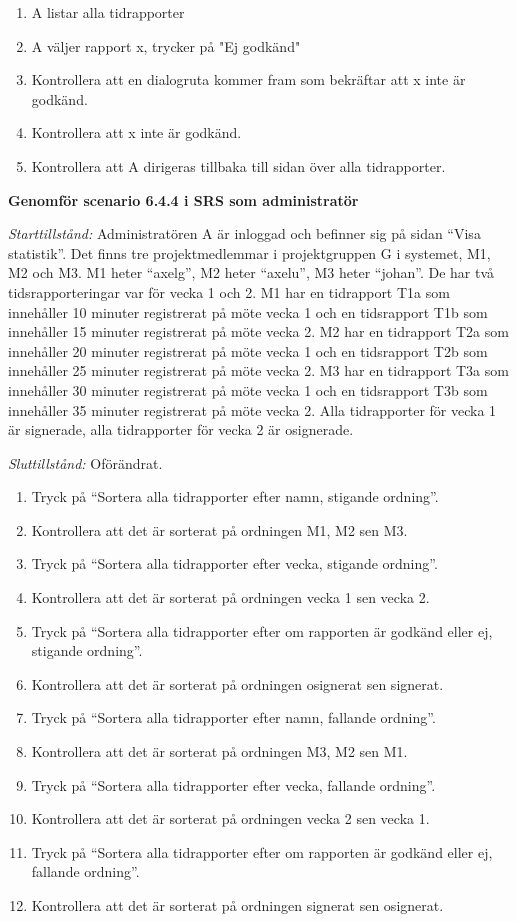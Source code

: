 \documentclass[a4paper]{article}
\begin{document}
\begin{ST}
\begin{enumerate}
\item A listar alla tidrapporter
\item A väljer rapport x, trycker på "Ej godkänd"
\item Kontrollera att en dialogruta kommer fram som bekräftar att x inte är godkänd.
\item Kontrollera att x inte är godkänd.
\item Kontrollera att A dirigeras tillbaka till sidan över alla tidrapporter.
\end{enumerate}

\item
\textbf{Genomför scenario 6.4.4 i SRS som administratör}

\emph{Starttillstånd:} Administratören A är inloggad och befinner sig på sidan ``Visa statistik''. Det finns tre projektmedlemmar i projektgruppen G i systemet, M1, M2 och M3. M1 heter ``axelg'', M2 heter ``axelu'', M3 heter ``johan''. De har två tidsrapporteringar var för vecka 1 och 2. M1 har en tidrapport T1a som innehåller 10 minuter registrerat på möte vecka 1 och en tidsrapport T1b som innehåller 15 minuter registrerat på möte vecka 2. M2 har en tidrapport T2a som innehåller 20 minuter registrerat på möte vecka 1 och en tidsrapport T2b som innehåller 25 minuter registrerat på möte vecka 2. M3 har en tidrapport T3a som innehåller 30 minuter registrerat på möte vecka 1 och en tidsrapport T3b som innehåller 35 minuter registrerat på möte vecka 2. Alla tidrapporter för vecka 1 är signerade, alla tidrapporter för vecka 2 är osignerade.

\emph{Sluttillstånd:} Oförändrat.

\begin{enumerate}
\item Tryck på ``Sortera alla tidrapporter efter namn, stigande ordning''.
\item Kontrollera att det är sorterat på ordningen M1, M2 sen M3.
\item Tryck på ``Sortera alla tidrapporter efter vecka, stigande ordning''.
\item Kontrollera att det är sorterat på ordningen vecka 1 sen vecka 2.
\item Tryck på ``Sortera alla tidrapporter efter om rapporten är godkänd eller ej, stigande ordning''.
\item Kontrollera att det är sorterat på ordningen osignerat sen signerat.
\item Tryck på ``Sortera alla tidrapporter efter namn, fallande ordning''.
\item Kontrollera att det är sorterat på ordningen M3, M2 sen M1.
\item Tryck på ``Sortera alla tidrapporter efter vecka, fallande ordning''.
\item Kontrollera att det är sorterat på ordningen vecka 2 sen vecka 1.
\item Tryck på ``Sortera alla tidrapporter efter om rapporten är godkänd eller ej, fallande ordning''.
\item Kontrollera att det är sorterat på ordningen signerat sen osignerat.
\end{enumerate}


\end{ST}
\end{document}
